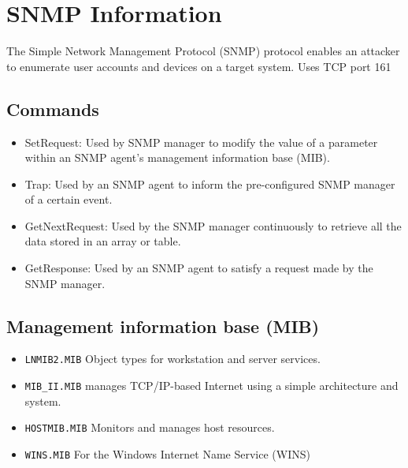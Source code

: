 \section{SNMP Information}
The Simple Network Management Protocol (SNMP) protocol enables an attacker to enumerate user accounts and devices on a target system. Uses TCP port 161
\subsection{Commands}
\begin{itemize}
    \item SetRequest: Used by SNMP manager to modify the value of a parameter within an SNMP agent's management information base (MIB).
    \item Trap: Used by an SNMP agent to inform the pre-configured SNMP manager of a certain event.
    \item GetNextRequest: Used by the SNMP manager continuously to retrieve all the data stored in an array or table.
    \item GetResponse: Used by an SNMP agent to satisfy a request made by the SNMP manager.
\end{itemize}

\subsection{Management information base (MIB)}
\begin{itemize}
    \item \verb|LNMIB2.MIB| Object types for workstation and server services.
    \item \verb|MIB_II.MIB| manages TCP/IP-based Internet using a simple architecture and system.
    \item \verb|HOSTMIB.MIB| Monitors and manages host resources.
    \item \verb|WINS.MIB| For the Windows Internet Name Service (WINS)
\end{itemize}